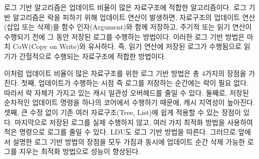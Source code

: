 로그 기반 알고리즘은 업데이트 비율이 많은 자료구조에 적합한 알고리즘이다. 
로그 기반 알고리즘은 락을 피하기 위해 업데이트 연산이 발생하면, 자료구조의 업데이트 
연산(삽입 또는 삭제)을 함수 인자(Argument)와 함께 저장하고, 주기적 또는 읽기 연산이 
수행되기 전에 그 동안 저장된 로그를 수행하는 방법이다.
이러한 로그 기반 방법은 마치 CoW(Copy on Write)와 유사하다.
즉, 읽기 연산에 저장된 로그가 수행됨으로 읽기가 간헐적으로 수행되는 자료구조에 적합한 방법이다.

이처럼 업데이트 비율이 많은 자료구조를 위한 로그 기반 방법은 총 4가지의 장점을 가진다. 
첫째, 업데이트가 수행하는 시점 즉 로그를 저장하는 순간에는 락이 필요 없다. 
따라서 락 자체가 가지고 있는 캐시 일관성 오버헤드를 줄일 수 있다. 
둘째로, 저장된 순차적인 업데이트 명령을 하나의 코어에서 수행하기 때문에, 캐시 지역성이 높아진다.
셋째, 큰 수정 없이 기존 여러 자료구조(Tree, List)에 쉽게 적용할 수 있는 장점이 있다.
마지막으로 저장된 로그를 실제 수행하지 않고, 여러 가지 최적화 방법을 사용하여 적은 
명령으로 로그를 줄일 수 있다. 
LDU도 로그 기반 방법을 따른다. 그러므로 앞에서 설명한 로그 기반 방법의 장점을 모두 가짐과 동시에
업데이트 순간 삭제 가능한 로그를 지우는 최적화 방법으로 성능이 향상된다.

